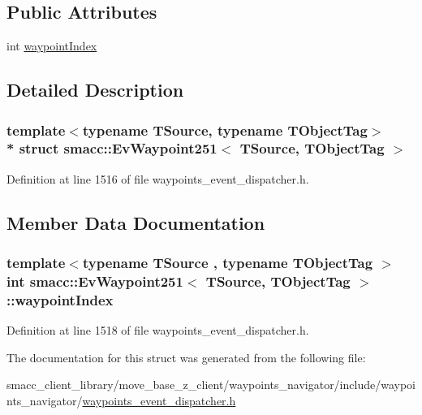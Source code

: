 \subsection*{Public Attributes}
\begin{DoxyCompactItemize}
\item 
int \hyperlink{structsmacc_1_1EvWaypoint251_a9da46a2198e43c38219dbe29143b1305}{waypoint\+Index}
\end{DoxyCompactItemize}


\subsection{Detailed Description}
\subsubsection*{template$<$typename T\+Source, typename T\+Object\+Tag$>$\\*
struct smacc\+::\+Ev\+Waypoint251$<$ T\+Source, T\+Object\+Tag $>$}



Definition at line 1516 of file waypoints\+\_\+event\+\_\+dispatcher.\+h.



\subsection{Member Data Documentation}
\subsubsection[{\texorpdfstring{waypoint\+Index}{waypointIndex}}]{\setlength{\rightskip}{0pt plus 5cm}template$<$typename T\+Source , typename T\+Object\+Tag $>$ int {\bf smacc\+::\+Ev\+Waypoint251}$<$ T\+Source, T\+Object\+Tag $>$\+::waypoint\+Index}\hypertarget{structsmacc_1_1EvWaypoint251_a9da46a2198e43c38219dbe29143b1305}{}\label{structsmacc_1_1EvWaypoint251_a9da46a2198e43c38219dbe29143b1305}


Definition at line 1518 of file waypoints\+\_\+event\+\_\+dispatcher.\+h.



The documentation for this struct was generated from the following file\+:\begin{DoxyCompactItemize}
\item 
smacc\+\_\+client\+\_\+library/move\+\_\+base\+\_\+z\+\_\+client/waypoints\+\_\+navigator/include/waypoints\+\_\+navigator/\hyperlink{waypoints__event__dispatcher_8h}{waypoints\+\_\+event\+\_\+dispatcher.\+h}\end{DoxyCompactItemize}
